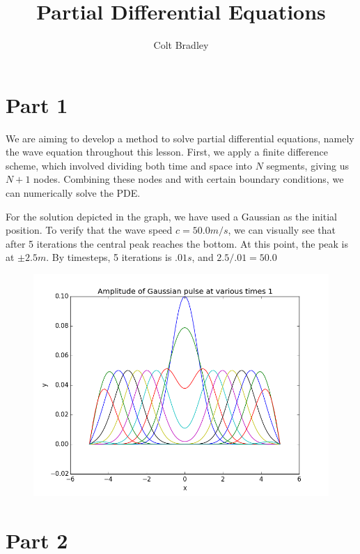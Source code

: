 \documentclass[11pt]{article}
\begin{document}
\title{Partial Differential Equations}
\author{Colt Bradley}
\date{}
\maketitle

\section{Part 1}

We are aiming to develop a method to solve partial differential equations, namely the wave equation throughout this lesson. First, we apply a finite difference scheme, which involved dividing both time and space into $N$ segments, giving us $N+1$ nodes. Combining these nodes and with certain boundary conditions, we can numerically solve the PDE. 

For the solution depicted in the graph, we have used a Gaussian as the initial position. To verify that the wave speed $c = 50.0m/s$, we can visually see that after 5 iterations the central peak reaches the bottom. At this point, the peak is at $\pm 2.5 m$. By timesteps, 5 iterations is $.01 s$, and $2.5/.01 = 50.0$

\begin{figure}[H]
\centering
\includegraphics[scale=.5]{part1.png}
\end{figure}


\section{Part 2}
\end{document}
